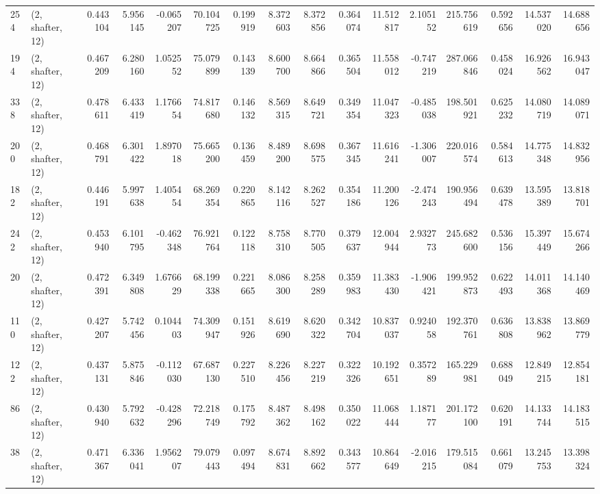 \begin{tabular}{llrrrrrrrrrrrrrr}
254 &  (2, shafter, 12) &   0.443104 &   5.956145 &  -0.065207 &    70.104725 &   0.199919 &   8.372603 &   8.372856 &  0.364074 &  11.512817 &   2.105152 &   215.756619 &  0.592656 &  14.537020 &  14.688656 \\
194 &  (2, shafter, 12) &   0.467209 &   6.280160 &   1.052552 &    75.079899 &   0.143139 &   8.600700 &   8.664866 &  0.365504 &  11.558012 &  -0.747219 &   287.066846 &  0.458024 &  16.926562 &  16.943047 \\
338 &  (2, shafter, 12) &   0.478611 &   6.433419 &   1.176654 &    74.817680 &   0.146132 &   8.569315 &   8.649721 &  0.349354 &  11.047323 &  -0.485038 &   198.501921 &  0.625232 &  14.080719 &  14.089071 \\
200 &  (2, shafter, 12) &   0.468791 &   6.301422 &   1.897018 &    75.665200 &   0.136459 &   8.489200 &   8.698575 &  0.367345 &  11.616241 &  -1.306007 &   220.016574 &  0.584613 &  14.775348 &  14.832956 \\
182 &  (2, shafter, 12) &   0.446191 &   5.997638 &   1.405454 &    68.269354 &   0.220865 &   8.142116 &   8.262527 &  0.354186 &  11.200126 &  -2.474243 &   190.956494 &  0.639478 &  13.595389 &  13.818701 \\
242 &  (2, shafter, 12) &   0.453940 &   6.101795 &  -0.462348 &    76.921764 &   0.122118 &   8.758310 &   8.770505 &  0.379637 &  12.004944 &   2.932773 &   245.682600 &  0.536156 &  15.397449 &  15.674266 \\
20  &  (2, shafter, 12) &   0.472391 &   6.349808 &   1.676629 &    68.199338 &   0.221665 &   8.086300 &   8.258289 &  0.359983 &  11.383430 &  -1.906421 &   199.952873 &  0.622493 &  14.011368 &  14.140469 \\
110 &  (2, shafter, 12) &   0.427207 &   5.742456 &   0.104403 &    74.309947 &   0.151926 &   8.619690 &   8.620322 &  0.342704 &  10.837037 &   0.924058 &   192.370761 &  0.636808 &  13.838962 &  13.869779 \\
122 &  (2, shafter, 12) &   0.437131 &   5.875846 &  -0.112030 &    67.687130 &   0.227510 &   8.226456 &   8.227219 &  0.322326 &  10.192651 &   0.357289 &   165.229981 &  0.688049 &  12.849215 &  12.854181 \\
86  &  (2, shafter, 12) &   0.430940 &   5.792632 &  -0.428296 &    72.218749 &   0.175792 &   8.487362 &   8.498162 &  0.350022 &  11.068444 &   1.187177 &   201.172100 &  0.620191 &  14.133744 &  14.183515 \\
38  &  (2, shafter, 12) &   0.471367 &   6.336041 &   1.956207 &    79.079443 &   0.097494 &   8.674831 &   8.892662 &  0.343577 &  10.864649 &  -2.016215 &   179.515084 &  0.661079 &  13.245753 &  13.398324 \\

\end{tabular}
